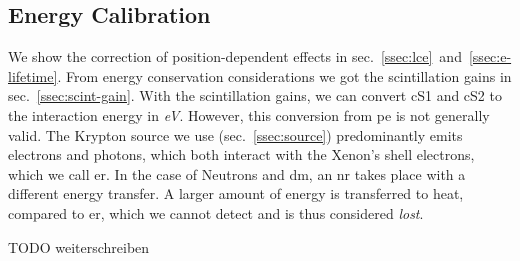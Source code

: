 
\FloatBarrier
\subsection{Energy Calibration}
\label{ssec:eng-scale}
\FloatBarrier


We show the correction of position-dependent effects in sec.~\ref{ssec:lce}~and~\ref{ssec:e-lifetime}.  %
From energy conservation considerations we got the scintillation gains in sec.~\ref{ssec:scint-gain}.  %
With the scintillation gains, we can convert cS1 and cS2 to the interaction energy in \textit{eV}.
However, this conversion from \gls{pe} is not generally valid.
The Krypton source we use (sec.~\ref{ssec:source}) predominantly emits electrons and photons, which both interact with the Xenon's shell electrons, which we call \gls{er}. %
In the case of Neutrons and \gls{dm}, an \gls{nr} takes place with a different energy transfer.
A larger amount of energy is transferred to heat, compared to \gls{er}, which we cannot detect and is thus considered \emph{lost}.

TODO weiterschreiben





